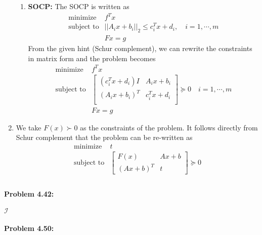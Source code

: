 \documentclass[12pt] {article}
\begin{document}
\begin{enumerate}
\begin{enumerate}
\item \textbf{SOCP:}
The SOCP is written as 
\[
\begin{array}{cl}
\text{minimize} & f^{T}x\\
\text{subject to} & ||A_{i}x +b_{i} ||_{2} \leq c_{i}^{T}x+d_{i}, \quad i=1,\cdots,m\\
&Fx = g
\end{array} 
\]
From the given hint (Schur complement), we can rewrite the constraints in matrix form and the problem becomes 
\[
\begin{array}{cl}
\text{minimize} & f^{T}x\\
\text{subject to} & \left[ \begin{array}{cc}
                     (c_{i}^{T}x+d_{i})I & A_{i}x+b_{i} \\
                     (A_{i}x+b_{i})^{T} & c_{i}^{T}x+d_{i} \\
                     \end{array} \right] \succeq 0 \quad i=1,\cdots,m\\
&Fx = g
\end{array} 
\]
\end{enumerate}
\item We take $F(x) \succ 0 $ as the constraints of the problem. It follows directly from Schur complement that the problem can be re-written as 
\[
\begin{array}{cl}
\text{minimize} & t\\
\text{subject to} & \left[ \begin{array}{cc}
					F(x)       & Ax+b\\
					(Ax+b)^{T} & t
                     \end{array} \right] \succeq 0 \\
\end{array} 
\]




\end{enumerate}
\paragraph{Problem 4.42:} 
$\mathscr{I}$
\paragraph{Problem 4.50:} 
 

\end{document}
